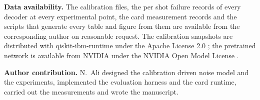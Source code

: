 \documentclass[pdflatex,sn-mathphys-num]{sn-jnl}
\begin{document}
\textbf{Data availability.} The calibration files, the per shot failure records of every decoder at every
experimental point, the card measurement records and the scripts that generate every table and figure from them are
available from the corresponding author on reasonable request. The calibration snapshots are distributed with
qiskit-ibm-runtime under the Apache License 2.0 \cite{qiskit_ibm_runtime}; the pretrained network is available from
NVIDIA under the NVIDIA Open Model License \cite{nvidia_fast_card}.

\textbf{Author contribution.} N.~Ali designed the calibration driven noise model and the experiments, implemented the
evaluation harness and the card runtime, carried out the measurements and wrote the manuscript.


\end{document}
